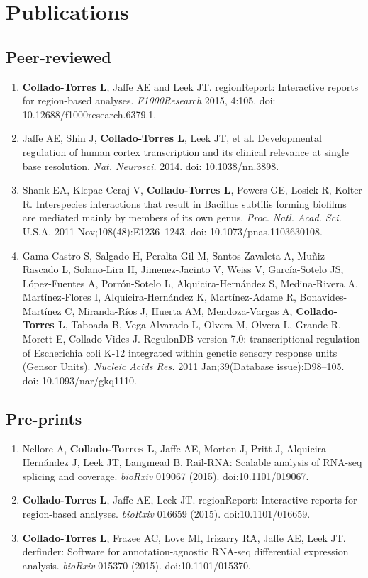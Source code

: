 \section{Publications}
\subsection{Peer-reviewed}
    \begin{enumerate}
        \item \textbf{Collado-Torres L}, Jaffe AE and Leek JT. regionReport: Interactive reports for region-based analyses. \emph{F1000Research} 2015, 4:105. doi: 10.12688/f1000research.6379.1.
        \item Jaffe AE, Shin J, \textbf{Collado-Torres L}, Leek JT, et al. Developmental regulation of human cortex transcription and its clinical relevance at single base resolution. \emph{Nat. Neurosci.} 2014. doi: 10.1038/nn.3898.
        \item Shank EA, Klepac-Ceraj V, \textbf{Collado-Torres L}, Powers GE, Losick R, Kolter R. Interspecies interactions that result in Bacillus subtilis forming biofilms are mediated mainly by members of its own genus. \emph{Proc. Natl. Acad. Sci.} U.S.A. 2011 Nov;108(48):E1236–1243. doi: 10.1073/pnas.1103630108.
        \item Gama-Castro S, Salgado H, Peralta-Gil M, Santos-Zavaleta A, Muñiz-Rascado L, Solano-Lira H, Jimenez-Jacinto V, Weiss V, Garc\'ia-Sotelo JS, L\'opez-Fuentes A, Porr\'on-Sotelo L, Alquicira-Hern\'andez S, Medina-Rivera A, Mart\'inez-Flores I, Alquicira-Hern\'andez K, Mart\'inez-Adame R, Bonavides-Mart\'inez C, Miranda-R\'ios J, Huerta AM, Mendoza-Vargas A, \textbf{Collado-Torres L}, Taboada B, Vega-Alvarado L, Olvera M, Olvera L, Grande R, Morett E, Collado-Vides J. RegulonDB version 7.0: transcriptional regulation of Escherichia coli K-12 integrated within genetic sensory response units (Gensor Units). \emph{Nucleic Acids Res.} 2011 Jan;39(Database issue):D98–105. doi: 10.1093/nar/gkq1110.
    \end{enumerate}
\subsection{Pre-prints}
    \begin{enumerate}
        \item Nellore A, \textbf{Collado-Torres L}, Jaffe AE, Morton J, Pritt J, Alquicira-Hernández J, Leek JT, Langmead B. Rail-RNA: Scalable analysis of RNA-seq splicing and coverage. \emph{bioRxiv} 019067 (2015). doi:10.1101/019067.
        \item \textbf{Collado-Torres L}, Jaffe AE, Leek JT. regionReport: Interactive reports for region-based analyses. \emph{bioRxiv} 016659 (2015). doi:10.1101/016659.
        \item \textbf{Collado-Torres L}, Frazee AC, Love MI, Irizarry RA, Jaffe AE, Leek JT. derfinder: Software for annotation-agnostic RNA-seq differential expression analysis. \emph{bioRxiv} 015370 (2015). doi:10.1101/015370.
    \end{enumerate}
